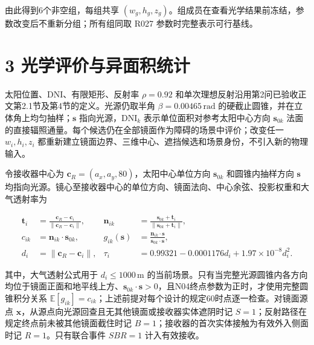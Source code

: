 \documentclass[UTF8,fontset=windows,zihao=-4]{ctexart}
\begin{document}
由此得到6个非空组，每组共享 \((w_g,h_g,z_g)\)。组成员在查看光学结果前冻结，参数改变后不重新分组；所有组同取 R027 参数时完整表示可行基线。

\section*{3 光学评价与异面积统计}

太阳位置、DNI、有限矩形、反射率 \(\rho=0.92\) 和单次理想反射沿用第2问已验收正文第2.1节及第4节的定义。光源仍取半角 \(\beta=0.00465\,\mathrm{rad}\) 的硬截止圆锥，并在立体角上均匀抽样；\(\boldsymbol s\) 指向光源，\(\mathrm{DNI}_k\) 表示单位面积对参考太阳中心方向 \(\boldsymbol s_{0k}\) 法面的直接辐照通量。每个候选仍在全部镜面作为障碍的场景中评价；改变任一 \(w_i,h_i,z_i\) 都重新建立镜面边界、三维中心、遮挡候选和场景身份，不引入新的物理输入。

\par\noindent\begin{minipage}{\linewidth}
令接收器中心为 \(\boldsymbol c_R=(a_x,a_y,80)\)，太阳中心单位方向 \(\boldsymbol s_{0k}\) 和圆锥内抽样方向 \(\boldsymbol s\) 均指向光源。镜心至接收器中心的单位方向、镜面法向、中心余弦、投影权重和大气透射率为

\[
\begin{aligned}
\boldsymbol t_i&=\frac{\boldsymbol c_R-\boldsymbol c_i}
{\|\boldsymbol c_R-\boldsymbol c_i\|},
&\boldsymbol n_{ik}&=\frac{\boldsymbol s_{0k}+\boldsymbol t_i}
{\|\boldsymbol s_{0k}+\boldsymbol t_i\|},\\
c_{ik}&=\boldsymbol n_{ik}\cdot\boldsymbol s_{0k},
&g_{ik}(\boldsymbol s)&=
\frac{\boldsymbol n_{ik}\cdot\boldsymbol s}
{\boldsymbol s_{0k}\cdot\boldsymbol s},\\
d_i&=\|\boldsymbol c_R-\boldsymbol c_i\|,
&\tau_i&=0.99321-0.0001176d_i+1.97\times10^{-8}d_i^2.
\end{aligned}
\tag{Q3-7}
\]
\end{minipage}\par

其中，大气透射公式用于 \(d_i\le1000\,\mathrm m\) 的当前场景。只有当完整光源圆锥内各方向均位于镜面正面和地平线上方、\(\boldsymbol s_{0k}\!\cdot\!\boldsymbol s>0\)，且N04终点参数为正时，才使用完整圆锥积分关系 \(\mathbb E[g_{ik}]=c_{ik}\)；上述前提对每个设计的规定60时点逐一检查。对镜面源点 \(\boldsymbol x\)，从源点向光源回查且无其他镜面或接收器实体遮阴时记 \(S=1\)；反射路径在规定终点前未被其他镜面截住时记 \(B=1\)；接收器的首次实体接触为有效外入侧面时记 \(R=1\)。只有联合事件 \(SBR=1\) 计入有效接收。
\end{document}
